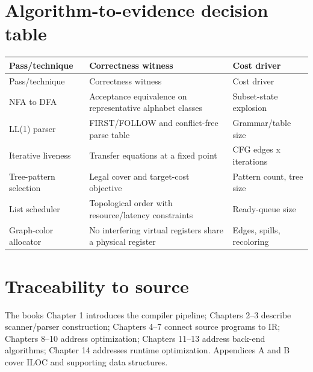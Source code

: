 \documentclass[10pt,letterpaper]{article}
\begin{document}
\section{Algorithm-to-evidence decision table}
\begin{longtable}{|>{\raggedright\arraybackslash}p{}|>{\raggedright\arraybackslash}p{}|>{\raggedright\arraybackslash}p{}|}
\hline
Pass/technique & Correctness witness & Cost driver\\ \hline\endfirsthead
\hline
Pass/technique & Correctness witness & Cost driver\\ \hline\endhead
NFA to DFA & Acceptance equivalence on representative alphabet classes & Subset-state explosion\\ \hline
LL(1) parser & FIRST/FOLLOW and conflict-free parse table & Grammar/table size\\ \hline
Iterative liveness & Transfer equations at a fixed point & CFG edges x iterations\\ \hline
Tree-pattern selection & Legal cover and target-cost objective & Pattern count, tree size\\ \hline
List scheduler & Topological order with resource/latency constraints & Ready-queue size\\ \hline
Graph-color allocator & No interfering virtual registers share a physical register & Edges, spills, recoloring\\ \hline
\end{longtable}

\section{Traceability to source}
The book\textquotesingle s Chapter 1 introduces the compiler pipeline; Chapters 2--3 describe scanner/parser construction; Chapters 4--7 connect source programs to IR; Chapters 8--10 address optimization; Chapters 11--13 address back-end algorithms; Chapter 14 addresses runtime optimization. Appendices A and B cover ILOC and supporting data structures.
\end{document}

